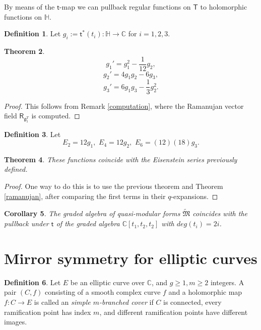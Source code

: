 \documentclass{article}
\numberwithin{equation}{section}
\numberwithin{figure}{section}
\theoremstyle{plain}
\newtheorem{theorem}{Theorem}[section]
\newtheorem{corollary}[theorem]{Corollary}
\theoremstyle{definition}
\newtheorem{definition}[theorem]{Definition}
\numberwithin{equation}{section}
\newtheorem[S, bodystyle=\normalfont\noindent]{defiS}{Definition}[section]
\begin{document}
By means of the $\mathsf{t}$-map we can pullback regular functions on $\mathsf{T}$ to holomorphic functions on $\mathbb{H}$.


\begin{definition}
Let $g_i:=\mathsf{t}^*(t_i):\mathbb{H}\rightarrow\mathbb{C}$ for $i=1,2,3$.
\end{definition}

\begin{theorem}
 $$g_1'=g_1^2-\frac{1}{12}g_2,$$
    $$g_2'=4g_1g_2-6g_3,$$
    $$g_3'=6g_1g_3-\frac{1}{3}g_2^2.$$
\end{theorem}
\begin{proof}
This follows from Remark \ref{computation}, where the Ramanujan vector field $\mathsf{R}_{\mathfrak{g}_1^T}$ is computed.
\end{proof}

\begin{definition}
Let $$E_2=12g_1,\,\, E_4=12g_2,\,\, E_6=(12)(18)g_3.$$
\end{definition}

\begin{theorem}
These functions coincide with the Eisenstein series previously defined.
\end{theorem}
\begin{proof}
One way to do this is to use the previous theorem and Theorem \ref{ramanujan}, after comparing the first terms in their $q$-expansions.
\end{proof}

\begin{corollary}The graded algebra of quasi-modular forms $\mathfrak{\tilde{M}}$ coincides with the pullback under $\mathsf{t}$ of the graded algebra $\mathbb{C}[t_1,t_2,t_2]$ with $deg(t_i)=2i$.
\end{corollary}

\section{Mirror symmetry for elliptic curves}



\begin{definition} 
Let $E$ be an elliptic curve over $\mathbb{C}$, and $g\geq 1, m\geq 2$ integers. A pair $(C,f)$ consisting of a smooth complex curve $f$ and a holomorphic map $f:C\rightarrow E$ is called an \textit{simple $m$-branched cover} if $C$ is connected, every ramification point has index $m$, and different ramification points have different images.

\end{definition}
\end{document}
